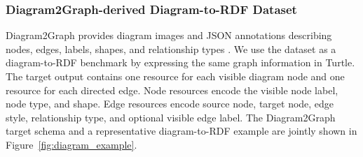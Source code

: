 \documentclass[preprint,12pt]{elsarticle}
\begin{document}
\subsubsection{Diagram2Graph-derived Diagram-to-RDF Dataset}
Diagram2Graph provides diagram images and JSON annotations describing nodes, edges, labels, shapes, and relationship types \citep{diagram2graph}. We use the dataset as a diagram-to-RDF benchmark by expressing the same graph information in Turtle. The target output contains one resource for each visible diagram node and one resource for each directed edge. Node resources encode the visible node label, node type, and shape. Edge resources encode source node, target node, edge style, relationship type, and optional visible edge label. The Diagram2Graph target schema and a representative diagram-to-RDF example are jointly shown in Figure~\ref{fig:diagram_example}.
\end{document}
